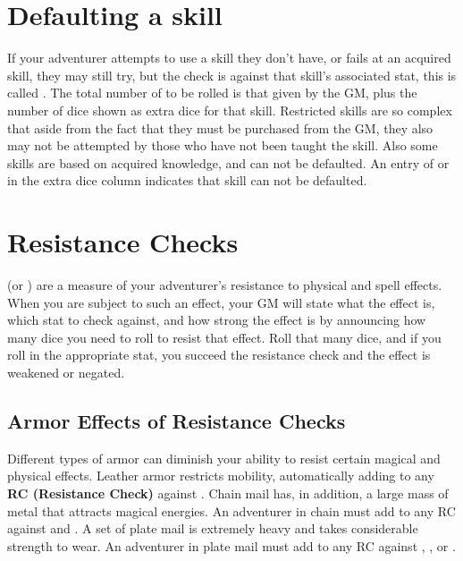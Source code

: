 \begin{multicols*}{2}
\section{Defaulting a skill}
If your adventurer attempts to use a skill they don't have, or fails at an acquired skill, they may still try, but the check is against that skill's associated stat, this is called . The total number of  to be rolled is that given by the GM, plus the number of dice shown as extra dice for that skill. Restricted skills are so complex that aside from the fact that they must be purchased from the GM, they also may not be attempted by those who have not been taught the skill. Also some skills are based on acquired knowledge, and can not be defaulted. An entry of  or  in the extra dice column indicates that skill can not be defaulted.


\section{Resistance Checks}
 (or \RC) are a measure of your adventurer's resistance to physical and spell effects. When you are subject to such an effect, your GM will state what the effect is, which stat to check against, and how strong the effect is by announcing how many dice you need to roll to resist that effect. Roll that many dice, and if you roll  in the appropriate stat, you succeed the resistance check and the effect is weakened or negated.
\subsection{Armor Effects of Resistance Checks}
Different types of armor can diminish your ability to resist certain magical and physical effects. Leather armor restricts mobility, automatically adding  to any \textbf{RC (Resistance Check)} against \AGI. Chain mail has, in addition, a large mass of metal that attracts magical energies. An adventurer in chain must add  to any RC against \AGI and \PWR. A set of plate mail is extremely heavy and takes considerable strength to wear. An adventurer in plate mail must add  to any RC against \AGI, \PWR, or \STR.

\end{multicols*}
